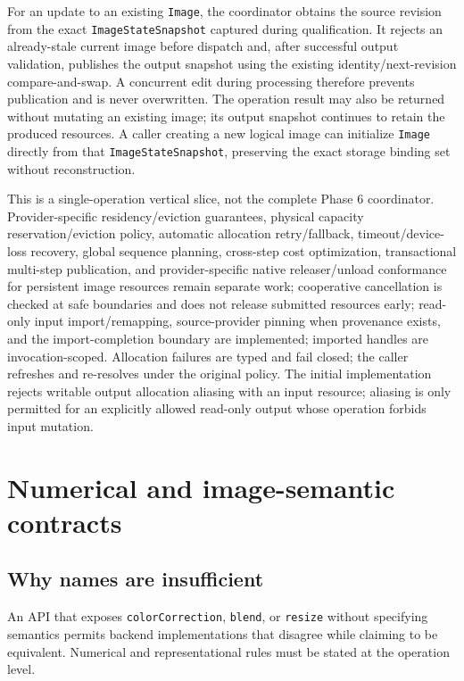 \documentclass[11pt,a4paper,oneside]{article}
\begin{document}
For an update to an existing \texttt{Image}, the coordinator obtains the source revision from the exact \texttt{ImageStateSnapshot} captured during qualification. It rejects an already-stale current image before dispatch and, after successful output validation, publishes the output snapshot using the existing identity/next-revision compare-and-swap. A concurrent edit during processing therefore prevents publication and is never overwritten. The operation result may also be returned without mutating an existing image; its output snapshot continues to retain the produced resources. A caller creating a new logical image can initialize \texttt{Image} directly from that \texttt{ImageStateSnapshot}, preserving the exact storage binding set without reconstruction.

This is a single-operation vertical slice, not the complete Phase 6 coordinator. Provider-specific residency/eviction guarantees, physical capacity reservation/eviction policy, automatic allocation retry/fallback, timeout/device-loss recovery, global sequence planning, cross-step cost optimization, transactional multi-step publication, and provider-specific native releaser/unload conformance for persistent image resources remain separate work; cooperative cancellation is checked at safe boundaries and does not release submitted resources early; read-only input import/remapping, source-provider pinning when provenance exists, and the import-completion boundary are implemented; imported handles are invocation-scoped. Allocation failures are typed and fail closed; the caller refreshes and re-resolves under the original policy. The initial implementation rejects writable output allocation aliasing with an input resource; aliasing is only permitted for an explicitly allowed read-only output whose operation forbids input mutation.

\section{Numerical and image-semantic contracts}

\subsection{Why names are insufficient}

An API that exposes \texttt{colorCorrection}, \texttt{blend}, or \texttt{resize} without specifying semantics permits backend implementations that disagree while claiming to be equivalent. Numerical and representational rules must be stated at the operation level.
\end{document}
